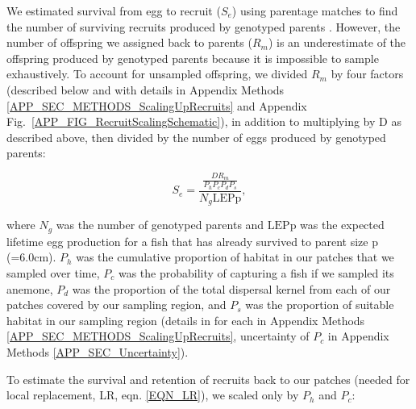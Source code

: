 \documentclass[12pt, oneside]{article}   	%
\begin{document}
We estimated survival from egg to recruit ($S_e$) using parentage matches to find the number of surviving recruits produced by genotyped parents \citep[similar to][]{johnson2018integrating}. However, the number of offspring we assigned back to parents ($R_m$) is an underestimate of the offspring produced by genotyped parents because it is impossible to sample exhaustively. To account for unsampled offspring, we divided $R_m$ by four factors (described below and with details in Appendix Methods \ref{APP_SEC_METHODS_ScalingUpRecruits} and Appendix Fig.\ \ref{APP_FIG_RecruitScalingSchematic}), in addition to multiplying by $\text{D}$ as described above, then divided by the number of eggs produced by genotyped parents:

\begin{equation}
S_e = \frac{\frac{D R_m}{P_h P_c P_d P_s}}{N_g \text{LEPp}}, \label{EQN_EggRecruitSurv}
\end{equation}

where $N_g$ was the number of genotyped parents and $\text{LEPp}$ was the expected lifetime egg production for a fish that has already survived to parent size p (=6.0cm). $P_h$ was the cumulative proportion of habitat in our patches that we sampled over time, $P_c$ was the probability of capturing a fish if we sampled its anemone, $P_d$ was the proportion of the total dispersal kernel from each of our patches covered by our sampling region, and $P_s$ was the proportion of suitable habitat in our sampling region (details in for each in Appendix Methods \ref{APP_SEC_METHODS_ScalingUpRecruits}, uncertainty of $P_c$ in Appendix Methods \ref{APP_SEC_Uncertainty}).

To estimate the survival and retention of recruits back to our patches (needed for local replacement, LR, eqn. \ref{EQN_LR}), we scaled only by $P_h$ and $P_c$: 
\end{document}
